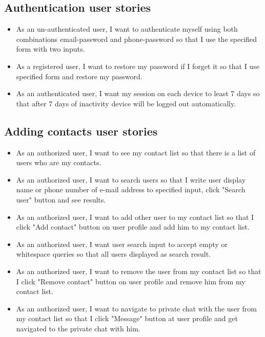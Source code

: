 \subsection{Authentication user stories}\label{subsec:authentication-user-stories}
\begin{itemize}
    \item As an un-authenticated user, I want to authenticate myself using both combinations email-password and phone-password so that I use the specified form with two inputs.
    \item As a registered user, I want to restore my password if I forget it so that I use specified form and restore my password.
    \item As an authenticated user, I want my session on each device to least 7 days so that after 7 days of inactivity device will be logged out automatically.
\end{itemize}

\subsection{Adding contacts user stories}\label{subsec:adding-contacts}
\begin{itemize}
    \item As an authorized user, I want to see my contact list so that there is a list of users who are my contacts.
    \item As an authorized user, I want to search users so that I write user display name or phone number of e-mail address to specified input, click "Search user" button and see results.
    \item As an authorized user, I want to add other user to my contact list so that I click "Add contact" button on user profile and add him to my contact list.
    \item As an authorized user, I want user search input to accept empty or whitespace queries so that all users displayed as search result.
    \item As an authorized user, I want to remove the user from my contact list so that I click "Remove contact" button on user profile and remove him from my contact list.
    \item As an authorized user, I want to navigate to private chat with the user from my contact list so that I click "Message" button at user profile and get navigated to the private chat with him.
\end{itemize}

